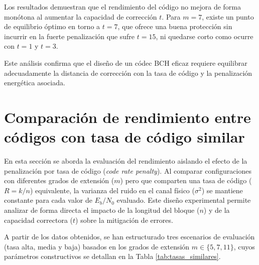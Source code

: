 Los resultados demuestran que el rendimiento del código no mejora de forma monótona al aumentar la capacidad de corrección $t$. Para $m=7$, existe un punto de equilibrio óptimo en torno a $t=7$, que ofrece una buena protección sin incurrir en la fuerte penalización que sufre $t=15$, ni quedarse corto como ocurre con $t=1$ y $t=3$.

Este análisis confirma que el diseño de un códec BCH eficaz requiere equilibrar adecuadamente la distancia de corrección con la tasa de código y la penalización energética asociada.

\section{Comparación de rendimiento entre códigos con tasa de código similar}

En esta sección se aborda la evaluación del rendimiento aislando el efecto de la penalización por tasa de código (\textit{code rate penalty}). Al comparar configuraciones con diferentes grados de extensión ($m$) pero que comparten una tasa de código ($R = k/n$) equivalente, la varianza del ruido en el canal físico ($\sigma^2$) se mantiene constante para cada valor de $E_b/N_0$ evaluado. Este diseño experimental permite analizar de forma directa el impacto de la longitud del bloque ($n$) y de la capacidad correctora ($t$) sobre la mitigación de errores.

A partir de los datos obtenidos, se han estructurado tres escenarios de evaluación (tasa alta, media y baja) basados en los grados de extensión $m \in \{5, 7, 11\}$, cuyos parámetros constructivos se detallan en la Tabla \ref{tab:tasas_similares}.


